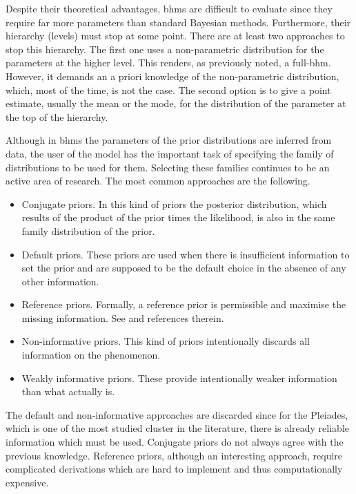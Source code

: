 Despite their theoretical advantages, \glspl{bhm}  are difficult to evaluate since they require far more parameters than standard Bayesian methods.
Furthermore, their hierarchy (levels) must stop at some point. There are at least two approaches to stop this hierarchy. The first one uses a non-parametric distribution for the parameters at the higher level. This renders, as previously noted, a full-\gls{bhm}. {However, it demands an a priori knowledge of the non-parametric distribution, which, most of the time, is not the case.} The second option is to give a point estimate, usually the mean or the mode, for the distribution of the parameter at the top of the hierarchy.  


Although in \glspl{bhm}  the parameters of the prior distributions are inferred from data, the user of the model has the important task of specifying the family of distributions to be used for them. Selecting these families continues to be an active area of research. The most common approaches are the following.

\begin{itemize}
\item Conjugate priors. In this kind of priors the posterior distribution, which results of the product of the prior times the likelihood, is also in the same family distribution of the prior. 

\item Default priors. These priors are used when there is insufficient information to set the prior and are supposed to be the default choice in the absence of any other information. 

\item Reference priors. Formally, a reference prior is permissible and maximise the missing information. See \citet{Berger2009} and references therein.

\item Non-informative priors. This kind of priors intentionally discards all information on the phenomenon.

\item Weakly informative priors. These provide intentionally weaker information than what actually is. 
\end{itemize}

The default and non-informative approaches are discarded since for the Pleiades, which is one of the most studied cluster in the literature, there is already reliable information which must be used.  Conjugate priors do not always agree with the previous knowledge. Reference priors, although an interesting approach, require complicated derivations which are hard to implement and thus computationally expensive. 

